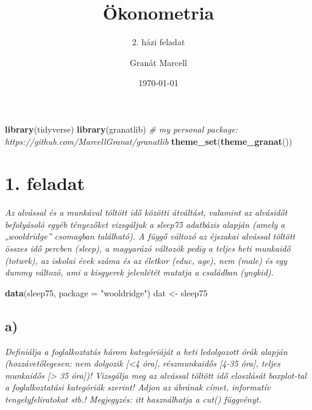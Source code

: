 \documentclass[
]{article}
\title{Ökonometria}
\subtitle{2. házi feladat}
\author{Granát Marcell}
\date{\today}
\newenvironment{Shaded}{\begin{snugshade}}{\end{snugshade}}
\newcommand{\CommentTok}[1]{\textcolor[rgb]{0.56,0.35,0.01}{\textit{#1}}}
\newcommand{\DataTypeTok}[1]{\textcolor[rgb]{0.13,0.29,0.53}{#1}}
\newcommand{\KeywordTok}[1]{\textcolor[rgb]{0.13,0.29,0.53}{\textbf{#1}}}
\newcommand{\NormalTok}[1]{#1}
\newcommand{\StringTok}[1]{\textcolor[rgb]{0.31,0.60,0.02}{#1}}
\begin{document}
\maketitle

{
\setcounter{tocdepth}{2}
\tableofcontents
}
\pagebreak

\begin{Shaded}
\begin{Highlighting}[]
\KeywordTok{library}\NormalTok{(tidyverse)}
\KeywordTok{library}\NormalTok{(granatlib) }\CommentTok{# my personal package: https://github.com/MarcellGranat/granatlib}
\KeywordTok{theme_set}\NormalTok{(}\KeywordTok{theme_granat}\NormalTok{())}
\end{Highlighting}
\end{Shaded}

\hypertarget{feladat}{%
\section{1. feladat}\label{feladat}}

\emph{Az alvással és a munkával töltött idő közötti átváltást, valamint
az alvásidőt befolyásoló egyéb tényezőket vizsgáljuk a sleep75 adatbázis
alapján (amely a „wooldridge'' csomagban található). A függő változó az
éjszakai alvással töltött összes idő percben (sleep), a magyarázó
változók pedig a teljes heti munkaidő (totwrk), az iskolai évek száma és
az életkor (educ, age), nem (male) és egy dummy változó, ami a kisgyerek
jelenlétét mutatja a családban (yngkid).}

\begin{Shaded}
\begin{Highlighting}[]
\KeywordTok{data}\NormalTok{(sleep75, }\DataTypeTok{package =} \StringTok{"wooldridge"}\NormalTok{)}
\NormalTok{dat <-}\StringTok{ }\NormalTok{sleep75}
\end{Highlighting}
\end{Shaded}

\hypertarget{a}{%
\subsection{a)}\label{a}}

\emph{Definiálja a foglalkoztatás három kategóriáját a heti ledolgozott
órák alapján (hozzávetőlegesen: nem dolgozik {[}\textless4 óra{]},
részmunkaidős {[}4-35 óra{]}, teljes munkaidős {[}\textgreater{} 35
óra{]})! Vizsgálja meg az alvással töltött idő eloszlását boxplot-tal a
foglalkoztatási kategóriák szerint! Adjon az ábrának címet, informatív
tengelyfeliratokat stb.! Megjegyzés: itt használhatja a cut()
függvényt.}
\end{document}
